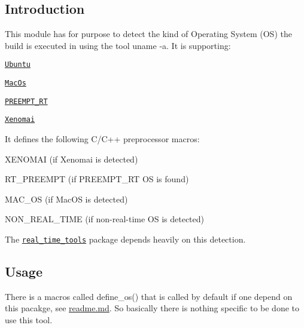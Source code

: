\subsection*{Introduction}

This module has for purpose to detect the kind of Operating System (OS) the build is executed in using the tool {\ttfamily uname -\/a}. It is supporting\+:


\begin{DoxyItemize}
\item \href{https://ubuntu.com/}{\tt Ubuntu}
\item \href{https://fr.wikipedia.org/wiki/Mac_OS}{\tt Mac\+Os}
\item \href{https://wiki.linuxfoundation.org/realtime/start}{\tt P\+R\+E\+E\+M\+P\+T\+\_\+\+RT}
\item \href{https://gitlab.denx.de/Xenomai/xenomai/-/wikis/home}{\tt Xenomai}
\end{DoxyItemize}

It defines the following C/\+C++ preprocessor macros\+:


\begin{DoxyItemize}
\item {\ttfamily X\+E\+N\+O\+M\+AI} (if Xenomai is detected)
\item {\ttfamily R\+T\+\_\+\+P\+R\+E\+E\+M\+PT} (if P\+R\+E\+E\+M\+P\+T\+\_\+\+RT OS is found)
\item {\ttfamily M\+A\+C\+\_\+\+OS} (if Mac\+OS is detected)
\item {\ttfamily N\+O\+N\+\_\+\+R\+E\+A\+L\+\_\+\+T\+I\+ME} (if non-\/real-\/time OS is detected)
\end{DoxyItemize}

The \href{https://machines-in-motion.github.io/code_documentation/real_time_tools/}{\tt real\+\_\+time\+\_\+tools} package depends heavily on this detection.

\subsection*{Usage}

There is a macros called {\ttfamily define\+\_\+os()} that is called by default if one depend on this pacakge, see \hyperlink{md_readme}{readme.md}. So basically there is nothing specific to be done to use this tool. 